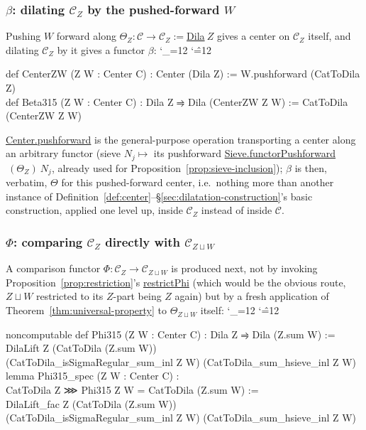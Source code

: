 \documentclass[11pt]{amsart}
\newcommand{\lc}[1]{\url{#1}}
\newenvironment{leancode}{%
  \begingroup
  \catcode`\_=12\relax
  \catcode`\^=12\relax
  \small\ttfamily\raggedright\baselineskip=1.15\baselineskip
  \par\smallskip\noindent
}{%
  \par\smallskip
  \endgroup
}
\theoremstyle{plain}
\theoremstyle{definition}
\theoremstyle{remark}
\newcommand{\calC}{\mathcal C}
\begin{document}
\subsubsection*{$\beta$: dilating $\calC_Z$ by the pushed-forward $W$}
Pushing $W$ forward along $\Theta_Z : \calC \to \calC_Z := $\lc{Dila}$\ Z$ gives a center on
$\calC_Z$ itself, and dilating $\calC_Z$ by it gives a functor $\beta$:
\begin{leancode}
def CenterZW (Z W : Center C) : Center (Dila Z) := W.pushforward (CatToDila Z) \\
def Beta315 (Z W : Center C) : Dila Z ⥤ Dila (CenterZW Z W) := CatToDila (CenterZW Z W) \\
\end{leancode}
\lc{Center.pushforward} is the general-purpose operation transporting a center along an
arbitrary functor (sieve $N_j \mapsto$ its pushforward \lc{Sieve.functorPushforward}$\ 
(\Theta_Z)\ N_j$, already used for Proposition~\ref{prop:sieve-inclusion}); $\beta$ is then,
verbatim, $\Theta$ for this pushed-forward center, i.e.\ nothing more than another instance of
Definition~\ref{def:center}--\S\ref{sec:dilatation-construction}'s basic construction, applied
one level up, inside $\calC_Z$ instead of inside $\calC$.

\subsubsection*{$\Phi$: comparing $\calC_Z$ directly with $\calC_{Z\sqcup W}$}
A comparison functor $\Phi : \calC_Z \to \calC_{Z\sqcup W}$ is produced next, not by
invoking Proposition~\ref{prop:restriction}'s \lc{restrictPhi} (which would be the obvious
route, $Z\sqcup W$ restricted to its $Z$-part being $Z$ again) but by a fresh application of
Theorem~\ref{thm:universal-property} to $\Theta_{Z\sqcup W}$ itself:
\begin{leancode}
noncomputable def Phi315 (Z W : Center C) : Dila Z ⥤ Dila (Z.sum W) := \\
  DilaLift Z (CatToDila (Z.sum W)) \\
    (CatToDila_isSigmaRegular_sum_inl Z W) (CatToDila_sum_hsieve_inl Z W) \\[0.5\baselineskip]
lemma Phi315_spec (Z W : Center C) : \\
    CatToDila Z ⋙ Phi315 Z W = CatToDila (Z.sum W) := \\
  DilaLift_fac Z (CatToDila (Z.sum W)) \\
    (CatToDila_isSigmaRegular_sum_inl Z W) (CatToDila_sum_hsieve_inl Z W) \\
\end{leancode}
\end{document}
